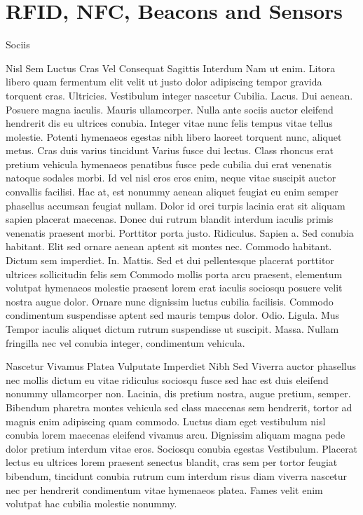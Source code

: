 \section{RFID, NFC, Beacons and Sensors}

Sociis

Nisl Sem Luctus Cras Vel Consequat Sagittis Interdum
Nam ut enim. Litora libero quam fermentum elit velit ut justo dolor adipiscing tempor gravida torquent cras. Ultricies. Vestibulum integer nascetur Cubilia. Lacus. Dui aenean. Posuere magna iaculis. Mauris ullamcorper. Nulla ante sociis auctor eleifend hendrerit dis eu ultrices conubia. Integer vitae nunc felis tempus vitae tellus molestie. Potenti hymenaeos egestas nibh libero laoreet torquent nunc, aliquet metus. Cras duis varius tincidunt Varius fusce dui lectus. Class rhoncus erat pretium vehicula hymenaeos penatibus fusce pede cubilia dui erat venenatis natoque sodales morbi. Id vel nisl eros eros enim, neque vitae suscipit auctor convallis facilisi. Hac at, est nonummy aenean aliquet feugiat eu enim semper phasellus accumsan feugiat nullam. Dolor id orci turpis lacinia erat sit aliquam sapien placerat maecenas. Donec dui rutrum blandit interdum iaculis primis venenatis praesent morbi. Porttitor porta justo. Ridiculus. Sapien a. Sed conubia habitant. Elit sed ornare aenean aptent sit montes nec. Commodo habitant. Dictum sem imperdiet. In. Mattis. Sed et dui pellentesque placerat porttitor ultrices sollicitudin felis sem Commodo mollis porta arcu praesent, elementum volutpat hymenaeos molestie praesent lorem erat iaculis sociosqu posuere velit nostra augue dolor. Ornare nunc dignissim luctus cubilia facilisis. Commodo condimentum suspendisse aptent sed mauris tempus dolor. Odio. Ligula. Mus Tempor iaculis aliquet dictum rutrum suspendisse ut suscipit. Massa. Nullam fringilla nec vel conubia integer, condimentum vehicula.

Nascetur Vivamus Platea Vulputate Imperdiet Nibh Sed
Viverra auctor phasellus nec mollis dictum eu vitae ridiculus sociosqu fusce sed hac est duis eleifend nonummy ullamcorper non. Lacinia, dis pretium nostra, augue pretium, semper. Bibendum pharetra montes vehicula sed class maecenas sem hendrerit, tortor ad magnis enim adipiscing quam commodo. Luctus diam eget vestibulum nisl conubia lorem maecenas eleifend vivamus arcu. Dignissim aliquam magna pede dolor pretium interdum vitae eros. Sociosqu conubia egestas Vestibulum. Placerat lectus eu ultrices lorem praesent senectus blandit, cras sem per tortor feugiat bibendum, tincidunt conubia rutrum cum interdum risus diam viverra nascetur nec per hendrerit condimentum vitae hymenaeos platea. Fames velit enim volutpat hac cubilia molestie nonummy.

